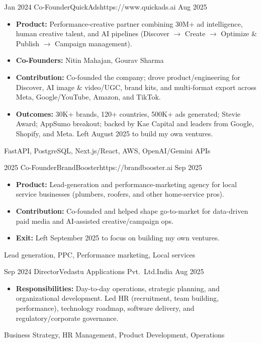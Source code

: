 \begin{experiences}
\experience
    {Jan 2024}   {Co-Founder}{QuickAds}{https://www.quickads.ai}
    {Aug 2025} {
                      \begin{itemize}
                       \item \textbf{Product:} Performance-creative partner combining 30M+ ad intelligence, human creative talent, and AI pipelines (Discover $\rightarrow$ Create $\rightarrow$ Optimize \& Publish $\rightarrow$ Campaign management).
                       \item \textbf{Co-Founders:} Nitin Mahajan, Gourav Sharma
                       \item \textbf{Contribution:} Co-founded the company; drove product/engineering for Discover, AI image \& video/UGC, brand kits, and multi-format export across Meta, Google/YouTube, Amazon, and TikTok.
                       \item \textbf{Outcomes:} 30K+ brands, 120+ countries, 500K+ ads generated; Stevie Award; AppSumo breakout; backed by Kae Capital and leaders from Google, Shopify, and Meta. Left August 2025 to build my own ventures.
                      \end{itemize}
                    }
                    {FastAPI, PostgreSQL, Next.js/React, AWS, OpenAI/Gemini APIs}

\emptySeparator

\experience
    {2025}   {Co-Founder}{BrandBooster}{https://brandbooster.ai}
    {Sep 2025} {
                      \begin{itemize}
                       \item \textbf{Product:} Lead-generation and performance-marketing agency for local service businesses (plumbers, roofers, and other home-service pros).
                       \item \textbf{Contribution:} Co-founded and helped shape go-to-market for data-driven paid media and AI-assisted creative/campaign ops.
                       \item \textbf{Exit:} Left September 2025 to focus on building my own ventures.
                      \end{itemize}
                    }
                    {Lead generation, PPC, Performance marketing, Local services}

\emptySeparator

\experience
    {Sep 2024}   {Director}{Vedastu Applications Pvt.\ Ltd.}{India}
    {Aug 2025} {
                      \begin{itemize}
                       \item \textbf{Responsibilities:} Day-to-day operations, strategic planning, and organizational development. Led HR (recruitment, team building, performance), technology roadmap, software delivery, and regulatory/corporate governance.
                      \end{itemize}
                    }
                    {Business Strategy, HR Management, Product Development, Operations}


\end{experiences}
